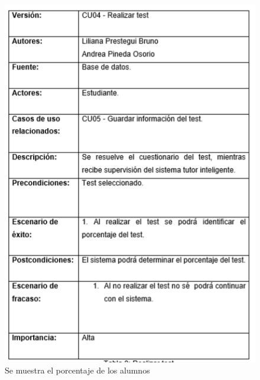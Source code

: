 \documentclass[letterpaper,oneside,openany,11pt]{book}
\begin{document}
\begin{figure}[H]
	\centering
	\includegraphics[width=1.0\textwidth]{./Imagenes/16}
	\caption{Se muestra el porcentaje de los alumnos}
\end{figure}
\end{document}
